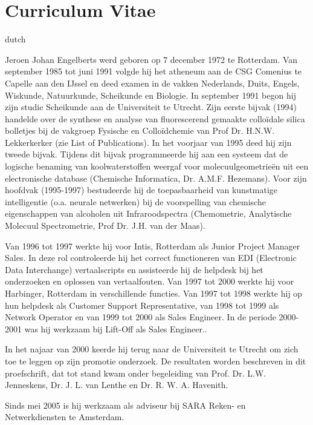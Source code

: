 \chapter*{Curriculum Vitae}
\fancyhead[RO]{\thepage}
\fancyhead[LE]{\thepage}
\begin{otherlanguage*}{dutch}
\label{cv}

Jeroen Johan Engelberts werd geboren op 7 december 1972 te Rotterdam. Van september 1985 tot juni 1991 volgde hij het atheneum aan de CSG Comenius te Capelle aan den IJssel en deed examen in de vakken Nederlands, Duits, Engels, Wiskunde, Natuurkunde, Scheikunde en Biologie. In september 1991 begon hij zijn studie Scheikunde aan de Universiteit te Utrecht. Zijn eerste bijvak (1994) handelde over de synthese en analyse van fluorescerend gemaakte collo\"idale silica bolletjes bij de vakgroep Fysische en Collo\"idchemie van Prof Dr. H.N.W. Lekkerkerker (zie List of Publications). In het voorjaar van 1995 deed hij zijn tweede bijvak. Tijdens dit bijvak programmeerde hij aan een systeem dat de logische benaming van koolwaterstoffen weergaf voor molecuulgeometrie\"en uit een electronische database (Chemische Informatica, Dr. A.M.F. Hezemans). Voor zijn hoofdvak (1995-1997) bestudeerde hij de toepasbaarheid van kunstmatige intelligentie (o.a. neurale netwerken) bij de voorspelling van chemische eigenschappen van alcoholen uit Infraroodspectra (Chemometrie, Analytische Molecuul Spectrometrie, Prof Dr. J.H. van der Maas). 

 Van 1996 tot 1997 werkte hij voor Intis, Rotterdam als Junior Project Manager Sales. In deze rol controleerde hij het correct functioneren van EDI (Electronic Data Interchange) vertaalscripts en assisteerde hij de helpdesk bij het onderzoeken en oplossen van vertaalfouten.  Van 1997 tot 2000 werkte hij voor Harbinger, Rotterdam in verschillende functies. Van 1997 tot 1998 werkte hij op hun helpdesk als Customer Support Representative, van 1998 tot 1999 als Network Operator en van 1999 tot 2000 als Sales Engineer.  In de periode 2000-2001 was hij werkzaam bij Lift-Off als Sales Engineer..

In het najaar van 2000 keerde hij terug naar de Universiteit te Utrecht om zich toe te leggen op zijn promotie onderzoek. De resultaten worden beschreven in dit proefschrift, dat tot stand kwam onder begeleiding van  Prof. Dr. L.W.  Jenneskens, Dr. J. L. van Lenthe en Dr. R. W. A. Havenith.

Sinds mei 2005 is hij werkzaam als adviseur bij SARA Reken- en Netwerkdiensten te Amsterdam.
\end{otherlanguage*}
